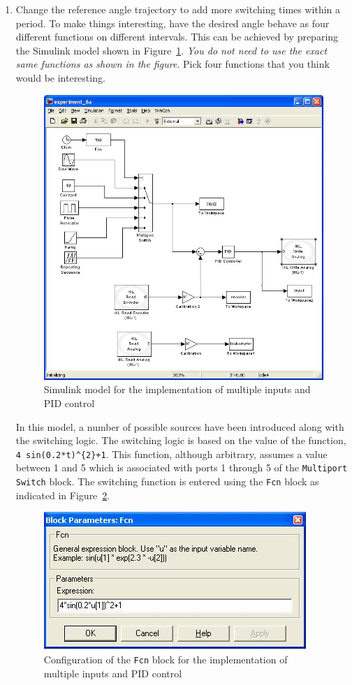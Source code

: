 \begin{enumerate}
    \item Change the reference angle trajectory to add more switching times
          within a period.  To make things interesting, have the desired angle behave
          as four different functions on different intervals.  This can be achieved by
          preparing the \textsf{Simulink} model shown in Figure~\ref{fig:multiSwitch}\@.
          \emph{You do not need to use the exact same functions as shown in the figure}. Pick
          four functions that you think would be interesting.
          \begin{figure}[htbp]
              \centering
              \includegraphics[width=0.6\hsize]{pix/lab6b.jpg}
              \caption{\textsf{Simulink} model for the implementation of multiple inputs and PID control}\label{fig:multiSwitch}
          \end{figure}%
          In this model, a number of possible sources have been introduced along with
          the switching logic.  The switching logic is based on the value of the
          function, \verb|4 sin(0.2*t)^{2}+1|.  This function, although arbitrary,
          assumes a value between 1 and 5 which is associated with ports 1 through 5 of
          the \verb|Multiport Switch| block.  The switching function is entered using
          the \verb|Fcn| block as indicated in Figure~\ref{fig:switchConfig}\@.
          \begin{figure}[htbp]
              \centering
              \includegraphics[width=0.6\hsize]{pix/fcnParameters.jpg}
              \caption{Configuration of the \texttt{Fcn} block for the implementation of multiple inputs and PID control}\label{fig:switchConfig}
          \end{figure}%


\end{enumerate}
